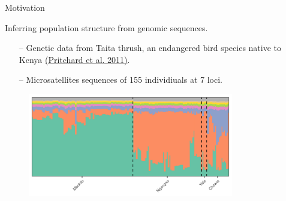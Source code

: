 
\begin{frame}{Motivation}

Inferring population structure from genomic sequences.
\begin{itemize}
  \item[--] Genetic data from Taita thrush, an endangered bird species native to Kenya
  {\color{blue} \href{https://web.stanford.edu/group/pritchardlab/publications/pdfs/PritchardEtAl00.pdf}{(Pritchard et al. 2011)}}.

  \item[--] Microsatellites sequences of 155 individiuals at 7 loci.
\end{itemize}


\begin{figure}[!h]
\centering
\includegraphics[width = 0.8\textwidth]{./figures/structure_example.png}
\end{figure}

\end{frame}

